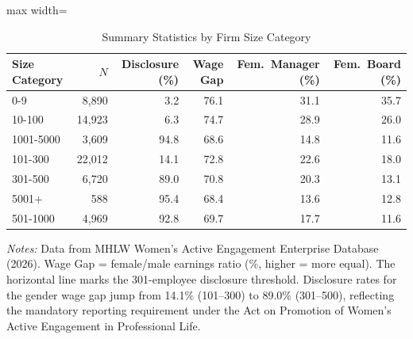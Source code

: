 \begin{table}[t]
\centering
\caption{Summary Statistics by Firm Size Category}
\label{tab:summary}
\begin{adjustbox}{max width=\textwidth}
\begin{tabular}{lrrrrr}
\hline\hline
Size Category & $N$ & Disclosure (\%) & Wage Gap & Fem.\ Manager (\%) & Fem.\ Board (\%) \\
\hline
0-9 & 8,890 & 3.2 & 76.1 & 31.1 & 35.7 \\
10-100 & 14,923 & 6.3 & 74.7 & 28.9 & 26.0 \\
1001-5000 & 3,609 & 94.8 & 68.6 & 14.8 & 11.6 \\
101-300 & 22,012 & 14.1 & 72.8 & 22.6 & 18.0 \\
\hline
301-500 & 6,720 & 89.0 & 70.8 & 20.3 & 13.1 \\
5001+ & 588 & 95.4 & 68.4 & 13.6 & 12.8 \\
501-1000 & 4,969 & 92.8 & 69.7 & 17.7 & 11.6 \\
\hline\hline
\end{tabular}
\end{adjustbox}
\begin{tablenotes}\small
\item \textit{Notes:} Data from MHLW Women's Active Engagement Enterprise Database (2026). Wage Gap = female/male earnings ratio (\%, higher = more equal). The horizontal line marks the 301-employee disclosure threshold. Disclosure rates for the gender wage gap jump from 14.1\% (101--300) to 89.0\% (301--500), reflecting the mandatory reporting requirement under the Act on Promotion of Women's Active Engagement in Professional Life.
\end{tablenotes}
\end{table}

